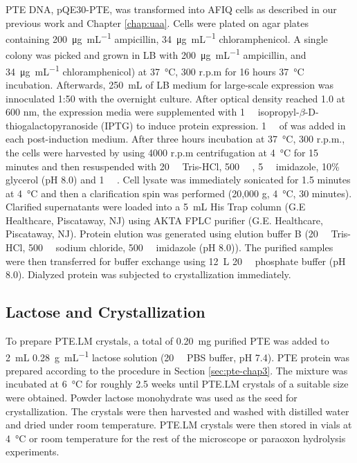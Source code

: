 \begin{refsection}
PTE DNA, pQE30-PTE, was transformed into AFIQ cells as described in our previous
work\cite{Yang2014a} and Chapter \ref{chap:uaa}. Cells were plated on agar
plates containing \SI{200}{\ug\per\mL} ampicillin, \SI{34}{\ug\per\mL}
chloramphenicol. A single colony was picked and grown in LB with
\SI{200}{\ug\per\mL} ampicillin, and \SI{34}{\ug\per\mL} chloramphenicol) at
\SI{37}{\celsius}, 300 r.p.m for 16 hours \SI{37}{\celsius} incubation.
Afterwards, \SI{250}{\mL} of LB medium for large-scale expression was
innoculated 1:50 with the overnight culture.  After optical density reached 1.0
at 600 nm, the expression media were supplemented with \SI{1}{\milli\Molar}
isopropyl-$\beta$-D-thiogalactopyranoside (IPTG) to induce protein expression.
\SI{1}{\milli\Molar} of  was added in each post-induction medium.
After three hours incubation at \SI{37}{\celsius}, 300 r.p.m., the cells were
harvested by using 4000 r.p.m centrifugation at \SI{4}{\celsius} for 15 minutes
and then resuspended with \SI{20}{\milli\Molar} Tris-HCl,
\SI{500}{\milli\Molar} , \SI{5}{\milli\Molar} imidazole, 10\% glycerol
(pH 8.0) and \SI{1}{\micro\Molar} . Cell lysate was immediately
sonicated for 1.5 minutes at \SI{4}{\celsius} and then a clarification spin was
performed (20,000 g, \SI{4}{\celsius}, 30 minutes).  Clarified supernatants
were loaded into a \SI{5}{\mL} His Trap column (G.E Healthcare, Piscataway, NJ)
using AKTA FPLC purifier (G.E.  Healthcare, Piscataway, NJ).  Protein elution
was generated using elution buffer B (\SI{20}{\milli\Molar} Tris-HCl,
\SI{500}{\milli\Molar} sodium chloride, \SI{500}{\milli\Molar} imidazole (pH
8.0)).  The purified samples were then transferred for buffer exchange using
\SI{12}{\L} \SI{20}{\milli\Molar} phosphate buffer (pH 8.0).  Dialyzed protein
was subjected to crystallization immediately.

\subsection{Lactose and Crystallization}

To prepare PTE.LM crystals, a total of \SI{0.20}{\milli\gram} purified PTE was
added to \SI{2}{\mL} \SI{0.28}{\gram\per\mL} lactose solution
(\SI{20}{\milli\Molar} PBS buffer, pH 7.4).  PTE protein was prepared
according to the procedure in Section \ref{sec:pte-chap3}. The mixture was
incubated at \SI{6}{\celsius} for roughly 2.5 weeks until PTE.LM crystals of a
suitable size were obtained.  Powder lactose monohydrate was used as the seed
for crystallization. The crystals were then harvested and washed with distilled
water and dried under room temperature. PTE.LM crystals were then stored in
vials at \SI{4}{\celsius} or room temperature for the rest of the microscope or
paraoxon hydrolysis experiments.


\end{refsection}
